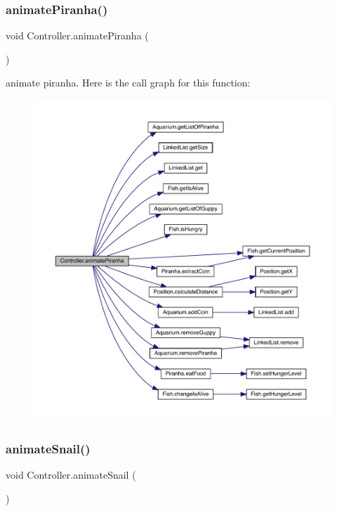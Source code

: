 \subsubsection{\texorpdfstring{animate\+Piranha()}{animatePiranha()}}
{\footnotesize\ttfamily void Controller.\+animate\+Piranha (\begin{DoxyParamCaption}{ }\end{DoxyParamCaption})\hspace{0.3cm}{\ttfamily [inline]}}

animate piranha. Here is the call graph for this function\+:
\nopagebreak
\begin{figure}[H]
\begin{center}
\leavevmode
\includegraphics[width=350pt]{class_controller_a4a6a2af6faf89e4bc96bac2dc8b190f4_cgraph}
\end{center}
\end{figure}
\mbox{\label{class_controller_a76a0629c8b8af69dfbf0cead4e6d04c3}} 
\subsubsection{\texorpdfstring{animate\+Snail()}{animateSnail()}}
{\footnotesize\ttfamily void Controller.\+animate\+Snail (\begin{DoxyParamCaption}{ }\end{DoxyParamCaption})\hspace{0.3cm}{\ttfamily [inline]}}

